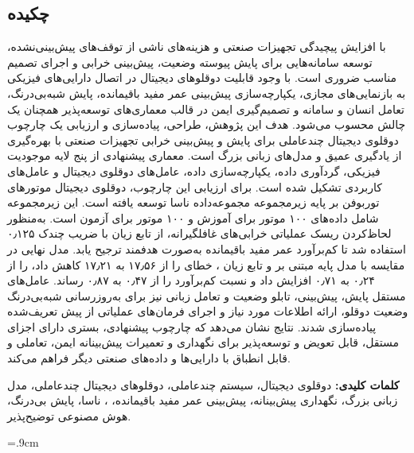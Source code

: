 \documentclass[a4paper,fleqn]{report}
\begin{document}
\subsection*{چکیده}
\begin{small}
\baselineskip=0.7cm

با افزایش پیچیدگی تجهیزات صنعتی و هزینه‌های ناشی از توقف‌های پیش‌بینی‌نشده، توسعه سامانه‌هایی برای پایش پیوسته وضعیت، پیش‌بینی خرابی و اجرای تصمیم مناسب ضروری است. با وجود قابلیت دوقلوهای دیجیتال در اتصال دارایی‌های فیزیکی به بازنمایی‌های مجازی، یکپارچه‌سازی پیش‌بینی عمر مفید باقیمانده، پایش شبه‌بی‌درنگ، تعامل انسان و سامانه و تصمیم‌گیری ایمن در قالب معماری‌های توسعه‌پذیر همچنان یک چالش محسوب می‌شود. هدف این پژوهش، طراحی، پیاده‌سازی و ارزیابی یک چارچوب دوقلوی دیجیتال چندعاملی برای پایش و پیش‌بینی خرابی تجهیزات صنعتی با بهره‌گیری از یادگیری عمیق و مدل‌های زبانی بزرگ است. معماری پیشنهادی از پنج لایه موجودیت فیزیکی، گردآوری داده، یکپارچه‌سازی داده، عامل‌های دوقلوی دیجیتال و عامل‌های کاربردی تشکیل شده است. برای ارزیابی این چارچوب، دوقلوی دیجیتال موتورهای توربوفن بر پایه زیرمجموعه  مجموعه‌داده
ناسا توسعه یافته است. این زیرمجموعه شامل داده‌های ۱۰۰ موتور برای آموزش و ۱۰۰ موتور برای آزمون است. به‌منظور لحاظ‌کردن ریسک عملیاتی خرابی‌های غافلگیرانه، از تابع زیان 
 با ضریب چندک ۰٫۱۲۵ استفاده شد تا کم‌برآورد عمر مفید باقیمانده به‌صورت هدفمند ترجیح یابد. مدل نهایی در مقایسه با مدل پایه مبتنی بر  و تابع زیان ، خطای  را از ۱۷٫۵۶ به ۱۷٫۲۱ کاهش داد،  را از ۰٫۲۴ به ۰٫۷۱ افزایش داد و نسبت کم‌برآورد را از ۰٫۴۷ به ۰٫۸۷ رساند. عامل‌های مستقل پایش، پیش‌بینی، تابلو وضعیت و تعامل زبانی نیز برای به‌روزرسانی شبه‌بی‌درنگ وضعیت دوقلو، ارائه اطلاعات مورد نیاز و اجرای فرمان‌های عملیاتی از پیش‌ تعریف‌شده پیاده‌سازی شدند. نتایج نشان می‌دهد که چارچوب پیشنهادی، بستری دارای اجزای مستقل، قابل تعویض و توسعه‌پذیر برای نگهداری و تعمیرات پیش‌بینانه ایمن، تعاملی و قابل انطباق با دارایی‌ها و داده‌های صنعتی دیگر فراهم می‌کند.


\vspace*{0.7 cm}
\noindent\textbf{کلمات کلیدی:}
دوقلوی دیجیتال، سیستم چندعاملی، دوقلوهای دیجیتال چندعاملی، مدل زبانی بزرگ، نگهداری پیش‌بینانه، پیش‌بینی عمر مفید باقیمانده، 
،
ناسا،
 پایش بی‌درنگ، هوش مصنوعی توضیح‌پذیر.
\end{small}


\fontsize{12}{6}\selectfont
{}\fontsize{11}{6}
\baselineskip=.9cm
\end{document}
